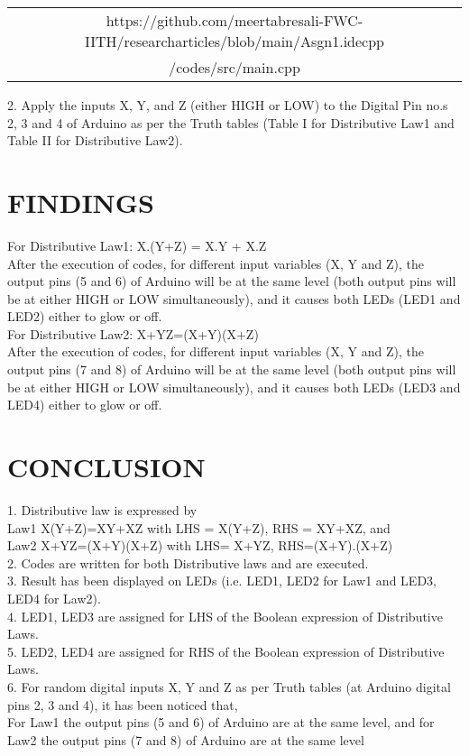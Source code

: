 \documentclass[conference]{IEEEtran}
\begin{document}
\begin{table}[h]
\centering
\begin{tabular}{| c |} \hline
 \rule{0pt}{20pt} https://github.com/meertabresali-FWC-IITH/researcharticles/blob/main/Asgn1.idecpp \\
 /codes/src/main.cpp \\\hline
\end{tabular}
\end{table}
\begin{flushleft}
2. Apply the inputs X, Y, and Z (either HIGH or LOW) to the Digital Pin no.s 2, 3 and 4 of Arduino as per the Truth tables (Table I for Distributive Law1 and Table II for Distributive Law2).
\end{flushleft}

\section{FINDINGS}
\begin{flushleft}
For Distributive Law1: X.(Y+Z) = X.Y + X.Z \\
After the execution of codes, for different input variables (X, Y and Z), the output pins (5 and 6) of Arduino will be at the same level (both output pins will be at either HIGH or LOW simultaneously), and it causes both LEDs (LED1 and LED2) either to glow or off.\\
For Distributive Law2: X+YZ=(X+Y)(X+Z) \\
After the execution of codes, for different input variables (X, Y and Z), the output pins (7 and 8) of Arduino will be at the same level (both output pins will be at either HIGH or LOW simultaneously), and it causes both LEDs (LED3 and LED4) either to glow or off.\\
\end{flushleft}
\section{CONCLUSION}
\begin{flushleft}
1. Distributive law is expressed by \\
Law1 X(Y+Z)=XY+XZ with LHS = X(Y+Z), RHS = XY+XZ, and \\
Law2 X+YZ=(X+Y)(X+Z) with LHS= X+YZ, RHS=(X+Y).(X+Z)\\
2. Codes are written for both Distributive laws and are executed.\\
3. Result has been displayed on LEDs (i.e. LED1, LED2 for Law1 and LED3, LED4 for Law2). \\
4. LED1, LED3 are assigned for LHS of the Boolean expression of Distributive Laws. \\
5. LED2, LED4 are assigned for RHS of the Boolean expression of Distributive Laws. \\
6. For random digital inputs X, Y and Z as per Truth tables (at Arduino digital pins 2, 3 and 4), it has been noticed that, \\
For Law1 the output pins (5 and 6) of Arduino are at the same level, and for Law2 the output pins (7 and 8) of Arduino are at the same level
\end{flushleft}
\end{document}
